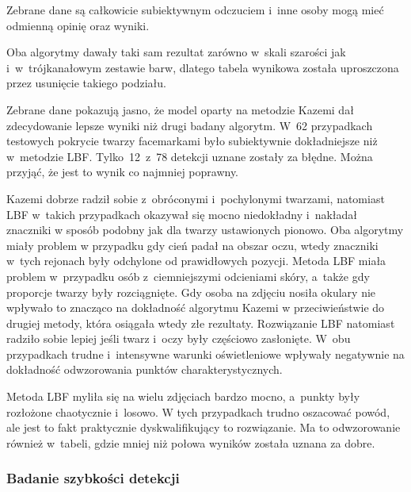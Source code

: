 Zebrane dane są całkowicie subiektywnym odczuciem i~inne osoby mogą  mieć odmienną opinię oraz wyniki.

\vspace{5mm}

Oba algorytmy dawały taki sam rezultat zarówno w~skali szarości jak i~w~trójkanałowym zestawie barw, dlatego tabela wynikowa została uproszczona przez usunięcie takiego podziału.



Zebrane dane pokazują jasno, że model oparty na metodzie Kazemi dał zdecydowanie lepsze wyniki niż drugi badany algorytm. W~62 przypadkach testowych pokrycie twarzy facemarkami było subiektywnie dokładniejsze niż w~metodzie LBF. Tylko~12~z~78 detekcji uznane zostały za błędne. Można przyjąć, że jest to wynik co najmniej poprawny.

\par

Kazemi dobrze radził sobie z~obróconymi i~pochylonymi twarzami, natomiast LBF w~takich przypadkach okazywał się mocno niedokładny i~nakładał znaczniki w sposób podobny jak dla twarzy ustawionych pionowo. Oba algorytmy miały problem w przypadku gdy cień padał na obszar oczu, wtedy znaczniki w~tych rejonach były odchylone od prawidłowych pozycji. Metoda LBF miała problem w~przypadku osób z~ciemniejszymi odcieniami skóry, a~także gdy proporcje twarzy były rozciągnięte. Gdy osoba na zdjęciu nosiła okulary nie wpływało to znacząco na dokładność algorytmu Kazemi w przeciwieństwie do drugiej metody, która osiągała wtedy złe rezultaty. Rozwiązanie LBF natomiast radziło sobie lepiej jeśli twarz i~oczy były częściowo zasłonięte. W~obu przypadkach trudne i~intensywne warunki oświetleniowe wpływały negatywnie na dokładność odwzorowania punktów charakterystycznych. 

\par

Metoda LBF myliła się na wielu zdjęciach bardzo mocno, a~punkty były rozłożone chaotycznie i~losowo. W tych przypadkach trudno oszacować powód, ale jest to fakt praktycznie dyskwalifikujący to rozwiązanie. Ma to odwzorowanie również w~tabeli, gdzie mniej niż połowa wyników została uznana za dobre. 


\subsubsection{Badanie szybkości detekcji}



